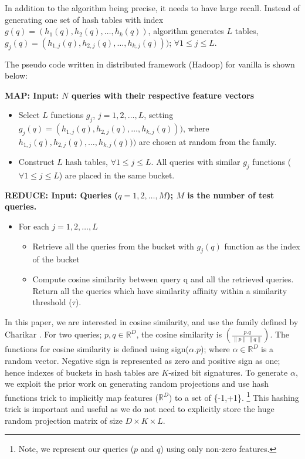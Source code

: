 In addition to the \lsh algorithm being precise, it needs to have large recall. 
Instead of generating one set of hash tables with index $g(q)=(h_1(q),h_2(q),\dots,h_k(q))$, 
\lsh algorithm generates $L$ tables, $g_j(q)=(h_{1,j}(q),h_{2,j}(q),\dots,h_{k,j}(q)))$; $\forall 1 \leq j \leq  L$. 


The pseudo code written in distributed framework (Hadoop) for vanilla \lsh is shown below: 


{\bf MAP: Input: $N$ queries with their respective feature vectors} \\
\begin{itemize}
\item Select $L$ functions $g_j$, $j=1,2,\dots,L$, setting  $g_j(q)=(h_{1,j}(q),h_{2,j}(q),\dots,h_{k,j}(q)))$, where $h_{1,j}(q),h_{2,j}(q),\dots,h_{k,j}(q)))$ are chosen at random from the \lsh family.
\item Construct $L$ hash tables, $\forall 1 \leq j \leq  L$. All queries with similar $g_j$ functions ($\forall 1 \leq j \leq  L$) are placed in the same bucket.    
\end{itemize}


{\bf REDUCE: Input: Queries ($q=1,2,\dots,M$); $M$ is the number of test queries.} \\
\begin{itemize}
\item For each $j=1,2,\dots,L$
\begin{itemize}
\item Retrieve all the queries from the bucket with $g_j(q)$ function as the index of the bucket 
\item Compute cosine similarity between query q and all the retrieved queries. Return all the queries which have similarity affinity within a similarity threshold ($\tau$). 
\end{itemize}
\end{itemize}

In this paper, we are interested in cosine similarity, and use the \lsh family defined by Charikar . 
For two queries; $p,q \in \mathbb{R}^D$, the cosine similarity is $\left( \frac{p.q}{ \| p \| \| q \| }\right)$. 
The \lsh functions for cosine similarity is defined using sign($\alpha.p$); where $\alpha \in \mathbb{R}^D$ is a random vector. 
Negative sign is represented as zero and positive sign as one; hence indexes of buckets in hash tables are $K$-sized bit signatures.  
To generate $\alpha$, we exploit the prior work on 
generating random projections \cite{Achlioptas03,LiH06} and 
use hash functions trick to implicitly map features ($\mathbb{R}^D$) to a set of \{-1,+1\}.
\footnote{Note, we represent our queries ($p$ and $q$) using only non-zero features.}  
This hashing trick is important and useful as we do not need to explicitly store the 
huge random projection matrix of size $D \times K \times L$.  


